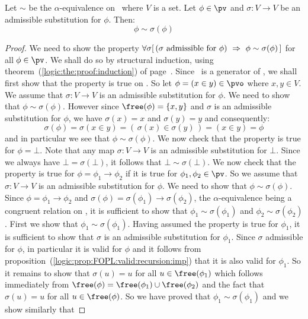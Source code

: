 \begin{prop}\label{logic:prop:admissible:sub:congruence}
Let $\sim$ be the $\alpha$-equivalence on \pv\ where $V$ is a
set. Let $\phi\in\pv$ and $\sigma:V\to V$ be an admissible
substitution for $\phi$. Then:
    \[
    \phi\sim\sigma(\phi)
    \]
\end{prop}

\noindent
\begin{proof}
We need to show the property $\forall\sigma[\,(\sigma\mbox{\
admissible for\ }\phi)\ \Rightarrow\ \phi\sim\sigma(\phi)\,]$ for
all $\phi\in\pv$. We shall do so by structural induction, using
theorem~(\ref{logic:the:proof:induction}) of
page~\pageref{logic:the:proof:induction}. Since \pvo\ is a generator
of \pv, we shall first show that the property is true on \pvo. So
let $\phi=(x\in y)\in\pvo$ where $x,y\in V$. We assume that
$\sigma:V\to V$ is an admissible substitution for $\phi$. We need to
show that $\phi\sim\sigma(\phi)$. However since
$\free(\phi)=\{x,y\}$ and $\sigma$ is an admissible substitution for
$\phi$, we have $\sigma(x)=x$ and $\sigma(y)=y$ and consequently:
    \[
    \sigma(\phi)=\sigma(x\in y)=(\,\sigma(x)\in\sigma(y)\,)=(x\in y)=\phi
    \]
and in particular we see that $\phi\sim\sigma(\phi)$. We now check
that the property is true for $\phi=\bot$. Note that any map
$\sigma:V\to V$ is an admissible substitution for $\bot$. Since we
always have $\bot=\sigma(\bot)$, it follows that
$\bot\sim\sigma(\bot)$. We now check that the property is true for
$\phi=\phi_{1}\to\phi_{2}$ if it is true for
$\phi_{1},\phi_{2}\in\pv$. So we assume that $\sigma:V\to V$ is an
admissible substitution for $\phi$. We need to show that
$\phi\sim\sigma(\phi)$. Since $\phi=\phi_{1}\to\phi_{2}$ and
$\sigma(\phi)=\sigma(\phi_{1})\to\sigma(\phi_{2})$, the 
$\alpha$-equivalence being a congruent relation on \pv, it is sufficient to
show that $\phi_{1}\sim\sigma(\phi_{1})$ and
$\phi_{2}\sim\sigma(\phi_{2})$. First we show that
$\phi_{1}\sim\sigma(\phi_{1})$. Having assumed the property is true
for $\phi_{1}$, it is sufficient to show that $\sigma$ is an
admissible substitution for $\phi_{1}$. Since $\sigma$ admissible
for $\phi$, in particular it is valid for $\phi$ and it follows from
proposition~(\ref{logic:prop:FOPL:valid:recursion:imp}) that it is
also valid for $\phi_{1}$. So it remains to show that $\sigma(u)=u$
for all $u\in\free(\phi_{1})$ which follows immediately from
$\free(\phi)=\free(\phi_{1})\cup\free(\phi_{2})$ and the fact that
$\sigma(u)=u$ for all $u\in\free(\phi)$. So we have proved that
$\phi_{1}\sim\sigma(\phi_{1})$ and we show similarly that

\end{proof}
